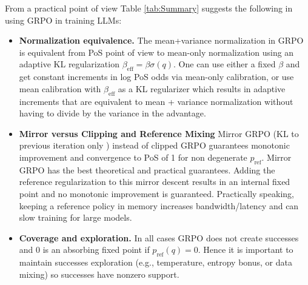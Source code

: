 \documentclass[11pt,reqno]{amsart}
\newenvironment{lessons}{%
  \begin{itemize}[leftmargin=*, topsep=2pt, itemsep=2pt]
}{%
  \end{itemize}
}
\begin{document}

From a practical point of view Table \ref{tab:Summary} suggests the following in using GRPO in training LLMs:

\begin{takeaway}
\begin{lessons}
 \item    \textbf{Normalization equivalence.} The mean{+}variance normalization in GRPO  is equivalent from PoS point of view  to mean-only normalization using an adaptive  KL regularization $\beta_{\mathrm{eff}}= \beta \sigma(q)$. One can use either a fixed $\beta$ and get constant increments in log PoS odds  via mean-only calibration, or use mean calibration with $\beta_{\mathrm{eff}}$ as a KL regularizer which results in adaptive increments that are equivalent to mean + variance normalization without having to divide by the variance in the advantage. 
\item \textbf{Mirror versus Clipping and Reference Mixing} Mirror GRPO (KL to previous iteration only ) instead of clipped GRPO  guarantees monotonic improvement  and convergence to PoS of 1 for non degenerate $p_{\mathrm{ref}} $. Mirror GRPO has  the best theoretical and practical guarantees. Adding the reference regularization to this mirror descent results in an internal fixed point and no monotonic improvement is guaranteed.  Practically speaking, keeping a reference policy in memory increases bandwidth/latency and can slow training for large models.  
 \item  \textbf{Coverage and exploration.}   In all cases GRPO does not create successes and 0 is an absorbing fixed point if $p_{\mathrm{ref}}(q)=0$. Hence it is important to maintain successes   exploration (e.g., temperature, entropy bonus, or data mixing) so successes have nonzero support. 
 \end{lessons}
\end{takeaway}
\end{document}
